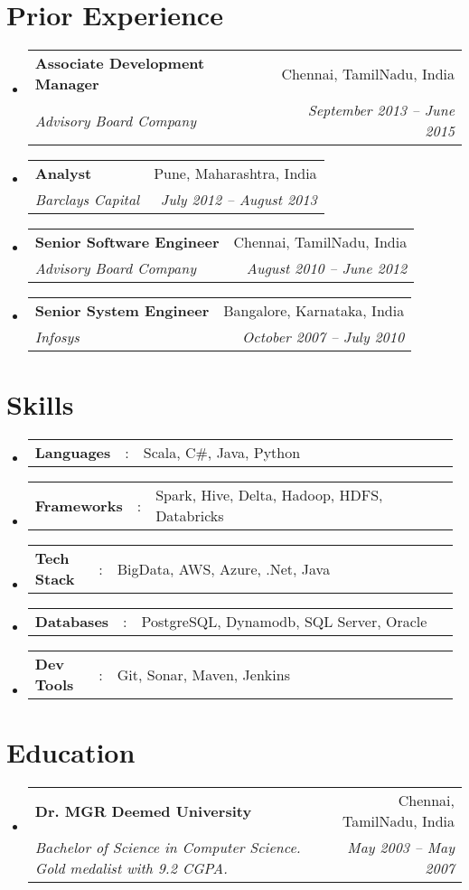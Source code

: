 \documentclass[a4paper,11pt]{article}
\makeatletter
\newcommand{\resumeSectionType}[3]{
  \item\begin{tabular*}{0.96\textwidth}[t]{
    p{0.15\linewidth}p{0.02\linewidth}p{0.81\linewidth}
  }
    \textbf{#1} & #2 & #3
  \end{tabular*}\vspace{-2pt}
}
\newcommand{\resumeQuadHeading}[4]{
  \item
  \begin{tabular*}{0.96\textwidth}[t]{l@{\extracolsep{\fill}}r}
    \textbf{#1} & #2 \\
    \textit{\small#3} & \textit{\small #4} \\
  \end{tabular*}
}
\newcommand{\resumeHeadingListStart}{
  \begin{itemize}[leftmargin=0.15in, label={}]
}
\newcommand{\resumeHeadingListEnd}{\end{itemize}}
\makeatother
\begin{document}
\section{Prior Experience}
\resumeHeadingListStart{}
\resumeQuadHeading{Associate Development Manager}{Chennai, TamilNadu, India}
{Advisory Board Company}{September 2013 -- June 2015}
\resumeQuadHeading{Analyst}{Pune, Maharashtra, India}
{Barclays Capital}{July 2012 -- August 2013}
\resumeQuadHeading{Senior Software Engineer}{Chennai, TamilNadu, India}
{Advisory Board Company}{August 2010 -- June 2012}
\resumeQuadHeading{Senior System Engineer}{Bangalore, Karnataka, India}
{Infosys}{October 2007 -- July 2010}
\resumeHeadingListEnd{}


\section{Skills}
  \resumeHeadingListStart{}
    \resumeSectionType{Languages}{:}{Scala, C\#, Java, Python}
    \resumeSectionType{Frameworks}{:}{Spark, Hive, Delta, Hadoop, HDFS, Databricks}
    \resumeSectionType{Tech Stack}{:}{BigData, AWS, Azure, .Net, Java}
    \resumeSectionType{Databases}{:}{PostgreSQL, Dynamodb, SQL Server, Oracle}
    \resumeSectionType{Dev Tools}{:}{Git, Sonar, Maven, Jenkins}
  \resumeHeadingListEnd{}



\section{Education}
  \resumeHeadingListStart{}
    \resumeQuadHeading{Dr. MGR Deemed University}{Chennai, TamilNadu, India}
    {Bachelor of Science in Computer Science. Gold medalist with 9.2 CGPA.}{May 2003 -- May 2007}
  \resumeHeadingListEnd{}
\end{document}
